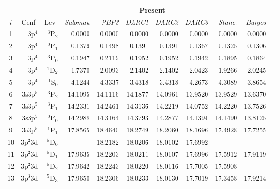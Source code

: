 \begin{table}
\footnotesize
\begin{center}
\begin{tabular}{@{} l *9r *1c @{}}
\toprule
 & & & & \multicolumn{4}{c}{\textbf{Present}} & &   \\
\multicolumn{1}{c}{$i$} & Conf- & Lev- & \textit{Saloman} & \textit{PBP3} & \textit{DARC1} & \textit{DARC2} & \textit{DARC3} & \textit{Stanc.} & \textit{Burgos} \\
 \midrule
 
       \multicolumn{1}{c}{1} & 3p$^4$ & $^3$P$_2$ & 0.0000 & 0.0000 & 0.0000 &  0.0000 & 0.0000 & 0.0000 & 0.0000 \\
        \multicolumn{1}{c}{2} & 3p$^4$ &$^3$P$_1$ & 0.1379 & 0.1498 & 0.1391 & 0.1391 &  0.1367 & 0.1325 & 0.1306\\
        \multicolumn{1}{c}{3} & 3p$^4$ &$^3$P$_0$ & 0.1947 & 0.2119 & 0.1952 & 0.1952 & 0.1942 & 0.1895 & 0.1864\\
       \multicolumn{1}{c}{4} & 3p$^4$ & $^1$D$_2$ & 1.7370 & 2.0093 & 2.1402 & 2.1402 & 2.0423 & 1.9266 & 2.0245\\
       \multicolumn{1}{c}{5} &  3p$^4$ & $^1$S$_0$ & 4.1244 & 4.3337 & 3.4318 & 3.4318 & 4.2673 & 4.3089 & 3.8654\\ 
      \multicolumn{1}{c}{6} & 3s3p$^5$ & $^3$P$_2$ & 14.1095 & 14.1116 & 14.1877 & 14.0961 & 13.9520 & 13.9529 & 13.6370\\ 
        \multicolumn{1}{c}{7} & 3s3p$^5$ & $^3$P$_1$ & 14.2331 & 14.2461 & 14.3136 & 14.2219 & 14.0752 & 14.2220 & 13.7526\\ 
         \multicolumn{1}{c}{8} & 3s3p$^5$ & $^3$P$_0$ & 14.2988 & 14.3164 & 14.3793 & 14.2877 & 14.1394 & 14.1490 & 13.8125\\ 
        \multicolumn{1}{c}{9} & 3s3p$^5$ & $^1$P$_1$ & 17.8565 & 18.4640 & 18.2749 & 18.2060 & 18.1696 & 17.4928 & 17.7255\\
          \multicolumn{1}{c}{10} & 3p$^3$3d & $^5$D$_0$ & -- & 18.2182 & 18.0206 & 18.0102 &  17.6992 & -- & --\\   
         \multicolumn{1}{c}{11} & 3p$^3$3d & $^5$D$_1$ & 17.9635 & 18.2203  & 18.0211 & 18.0107 & 17.6996 & 17.5912 & 17.9119\\   
          \multicolumn{1}{c}{12} & 3p$^3$3d & $^5$D$_2$ & 17.9642 & 18.2243 & 18.0220 & 18.0116 & 17.7005 & 17.5908 & -- \\   
         \multicolumn{1}{c}{13} & 3p$^3$3d & $^5$D$_3$ & 17.9650 & 18.2306 & 18.0233 & 18.0130 & 17.7019 & 17.3458 & 17.9214 \\   

\end{tabular}
\end{center}
\end{table}
